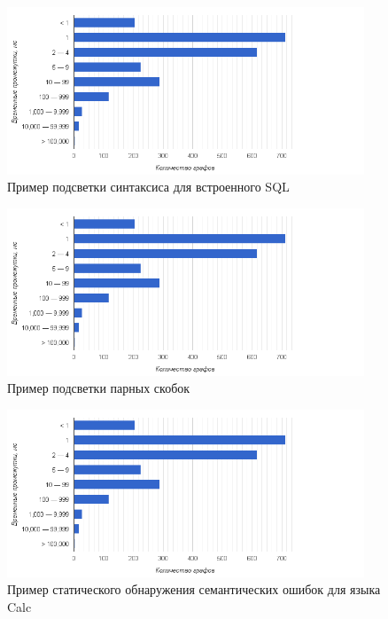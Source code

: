 \begin{figure}[H]
  \centering
 \includegraphics[width=0.95\textwidth]{pics/distr.png}
 \caption{Пример подсветки синтаксиса для встроенного SQL}
 \label{fig:sHiglighting}
\end{figure}

\begin{figure}[H]
  \centering
 \includegraphics[width=0.95\textwidth]{pics/distr.png}
 \caption{Пример подсветки парных скобок}
 \label{fig:braces}
\end{figure}

\begin{figure}[H]
  \centering
 \includegraphics[width=0.95\textwidth]{pics/distr.png}
 \caption{Пример статического обнаружения семантических ошибок для языка Calc}
 \label{fig:undeclaredVars}
\end{figure}

